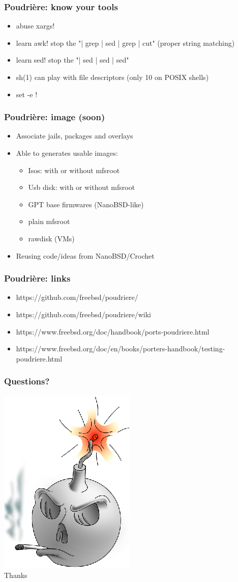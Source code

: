 \begin{frame}[fragile]
	\frametitle{Poudrière: know your tools}
	\begin{itemize}
		\item abuse xargs!
		\item learn awk! stop the "| grep | sed | grep | cut" (proper string matching)
		\item learn sed! stop the "| sed | sed | sed"
		\item sh(1) can play with file descriptors (only 10 on POSIX shells)
		\item set -e !
	\end{itemize}
\end{frame}

\begin{frame}
	\frametitle{Poudrière: image (soon)}
	\begin{itemize}
		\item Associate jails, packages and overlays
		\item Able to generates usable images:
			\begin{itemize}
				\item Isos: with or without mfsroot
				\item Usb disk: with or without mfsroot
				\item GPT base firmwares (NanoBSD-like)
				\item plain mfsroot
				\item rawdisk (VMs)
			\end{itemize}
		\item Reusing code/ideas from NanoBSD/Crochet
	\end{itemize}
\end{frame}

\begin{frame}
	\frametitle{Poudrière: links}
	\begin{itemize}
		\item https://github.com/freebsd/poudriere/
		\item https://github.com/freebsd/poudriere/wiki
		\item https://www.freebsd.org/doc/handbook/ports-poudriere.html
		\item https://www.freebsd.org/doc/en/books/porters-handbook/testing-poudriere.html
	\end{itemize}
\end{frame}

\begin{frame}
	\frametitle{Questions?}
	\center
	\includegraphics{poudriere.eps}
	\\
	\Huge Thanks
\end{frame}



